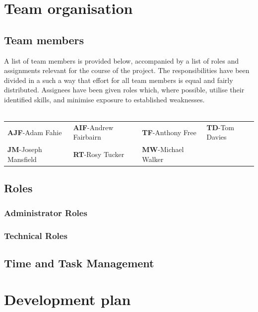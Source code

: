 \documentclass[10pt,a4paper]{article}
\begin{document}
\section{Team organisation}

\subsection{Team members}
A list of team members is provided below, accompanied by a list of roles and assignments relevant for the course of the project. The responsibilities have been divided in a such a way that effort for all team members is equal and fairly distributed. Assignees have been given roles which, where possible, utilise their identified skills, and minimise exposure to established weaknesses. \\
\\
\begin{tabular}{  p{4cm}  p{4cm}  p{4cm} p{4cm}  }
\textbf{AJF}-Adam Fahie            &         \textbf{AIF}-Andrew Fairbairn    &     \textbf{TF}-Anthony Free          &        \textbf{TD}-Tom Davies \\
\textbf{JM}-Joseph Mansfield     &        \textbf{RT}-Rosy Tucker           &          \textbf{MW}-Michael Walker \\
\end{tabular}

\subsection{Roles}
\subsubsection{Administrator Roles} 


\subsubsection{Technical Roles}


\subsection{Time and Task Management}

\section{Development plan}
\end{document}
